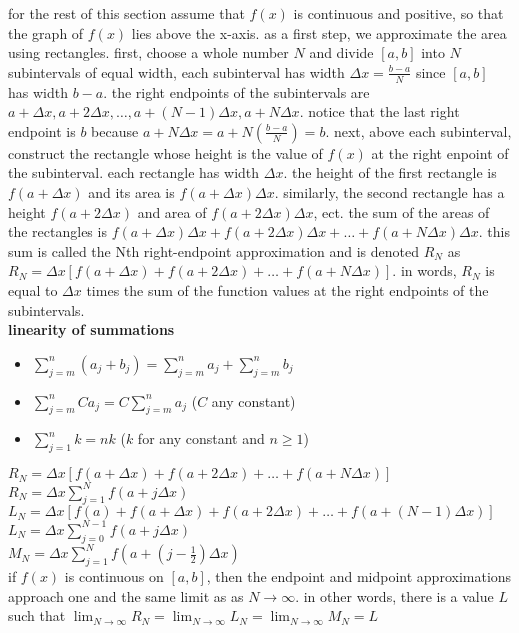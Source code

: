 \documentclass{article}
\begin{document}
for the rest of this section assume that $f(x)$ is continuous and positive, so that the graph of $f(x)$ lies above the x-axis. as a first step, we approximate the area using rectangles. first, choose a whole number $N$ and divide $[a, b]$ into $N$ subintervals of equal width, each subinterval has width $\Delta x = \frac{b - a}{N}$ since $[a, b]$ has width $b - a$. the right endpoints of the subintervals are $a + \Delta x, a + 2\Delta x, \ldots, a + (N - 1)\Delta x, a + N\Delta x$. notice that the last right endpoint is $b$ because $a + N\Delta x = a + N(\frac{b - a}{N}) = b$. next, above each subinterval, construct the rectangle whose height is the value of $f(x)$ at the right enpoint of the subinterval. each rectangle has width $\Delta x$. the height of the first rectangle is $f(a + \Delta x)$ and its area is $f(a + \Delta x)\Delta x$. similarly, the second rectangle has a height $f(a + 2\Delta x)$ and area of $f(a + 2\Delta x)\Delta x$, ect. the sum of the areas of the rectangles is $f(a + \Delta x)\Delta x + f(a + 2\Delta x)\Delta x + \ldots + f(a + N\Delta x)\Delta x$. this sum is called the Nth right-endpoint approximation and is denoted $R_N$ as $R_N = \Delta x[f(a + \Delta x) + f(a + 2\Delta x) + \ldots + f(a + N\Delta x)]$. in words, $R_N$ is equal to $\Delta x$ times the sum of the function values at the right endpoints of the subintervals.\\

\textbf{linearity of summations}
	\begin{itemize}
		\item $\sum_{j=m}^{n}(a_j + b_j) = \sum_{j=m}^{n}a_j + \sum_{j=m}^{n}b_j$
		\item $\sum_{j=m}^{n}Ca_j = C\sum_{j=m}^{n}a_j$ ($C$ any constant)
		\item $\sum_{j=1}^{n}k = nk$ ($k$ for any constant and $n \geq 1$)
	\end{itemize}

$R_N = \Delta x[f(a + \Delta x) + f(a + 2\Delta x) + \ldots + f(a + N\Delta x)]$\\
$R_N = \Delta x\sum_{j=1}^{N}f(a + j\Delta x)$\\
$L_N = \Delta x[f(a) + f(a + \Delta x) + f(a + 2\Delta x) + \ldots + f(a + (N -1)\Delta x)]$\\
$L_N = \Delta x\sum_{j=0}^{N-1}f(a + j\Delta x)$\\
$M_N = \Delta x\sum_{j=1}^{N}f(a + (j - \frac{1}{2})\Delta x)$\\

if $f(x)$ is continuous on $[a, b]$, then the endpoint and midpoint approximations approach one and the same limit as as $N \to \infty$. in other words, there is a value $L$ such that $\lim_{N \to \infty}R_N = \lim_{N \to \infty}L_N = \lim_{N \to \infty}M_N = L$\\
\end{document}
